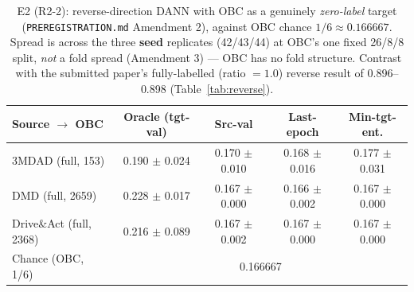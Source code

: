 \begin{table}[t]
\centering
\caption{E2 (R2-2): reverse-direction DANN with OBC as a genuinely \emph{zero-label} target (\texttt{PREREGISTRATION.md} Amendment 2), against OBC chance $1/6 \approx 0.166667$. Spread is across the three \textbf{seed} replicates (42/43/44) at OBC's one fixed 26/8/8 split, \emph{not} a fold spread (Amendment 3) --- OBC has no fold structure. Contrast with the submitted paper's fully-labelled (ratio $=1.0$) reverse result of 0.896--0.898 (Table~\ref{tab:reverse}).}
\label{tab:e2_reverse_zero_label}
\footnotesize
\setlength{\tabcolsep}{4pt}
\begin{tabular}{lcccc}
\toprule
Source $\rightarrow$ OBC & Oracle (tgt-val) & Src-val & Last-epoch & Min-tgt-ent. \\
\midrule
3MDAD (full, 153) & 0.190 $\pm$ 0.024 & 0.170 $\pm$ 0.010 & 0.168 $\pm$ 0.016 & 0.177 $\pm$ 0.031 \\
DMD (full, 2659) & 0.228 $\pm$ 0.017 & 0.167 $\pm$ 0.000 & 0.166 $\pm$ 0.002 & 0.167 $\pm$ 0.000 \\
Drive\&Act (full, 2368) & 0.216 $\pm$ 0.089 & 0.167 $\pm$ 0.002 & 0.167 $\pm$ 0.000 & 0.167 $\pm$ 0.000 \\
\midrule
Chance (OBC, 1/6) & \multicolumn{4}{c}{0.166667} \\
\bottomrule
\end{tabular}
\end{table}
